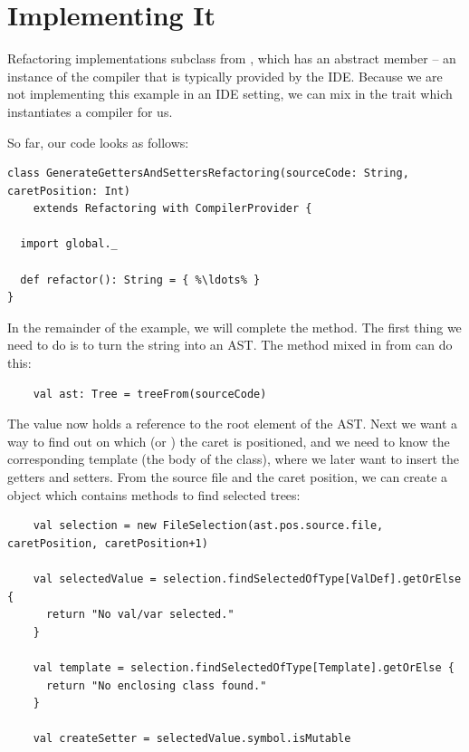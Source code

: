 \documentclass[10pt,a4paper,oneside]{scrreprt}
\begin{document}
\section{Implementing It}

Refactoring implementations subclass from , which has an abstract member  -- an instance of the compiler that is typically provided by the IDE. Because we are not implementing this example in an IDE setting, we can mix in the  trait which instantiates a compiler for us.

So far, our code looks as follows:

\begin{lstlisting}
class GenerateGettersAndSettersRefactoring(sourceCode: String, caretPosition: Int) 
    extends Refactoring with CompilerProvider {
  
  import global._
  
  def refactor(): String = { %\ldots% }
}
\end{lstlisting}

In the remainder of the example, we will complete the  method. The first thing we need to do is to turn the  string into an AST. The  method mixed in from  can do this:

\begin{lstlisting}
    val ast: Tree = treeFrom(sourceCode)
\end{lstlisting}

The  value now holds a reference to the root element of the AST. Next we want a way to find out on which  (or ) the caret is positioned, and we need to know the corresponding template (the body of the class), where we later want to insert the getters and setters. From the source file and the caret position, we can create a  object which contains methods to find selected trees:
    
\begin{lstlisting}
    val selection = new FileSelection(ast.pos.source.file, caretPosition, caretPosition+1)
    
    val selectedValue = selection.findSelectedOfType[ValDef].getOrElse {
      return "No val/var selected."
    }
    
    val template = selection.findSelectedOfType[Template].getOrElse {
      return "No enclosing class found."
    }

    val createSetter = selectedValue.symbol.isMutable
\end{lstlisting}
\end{document}
